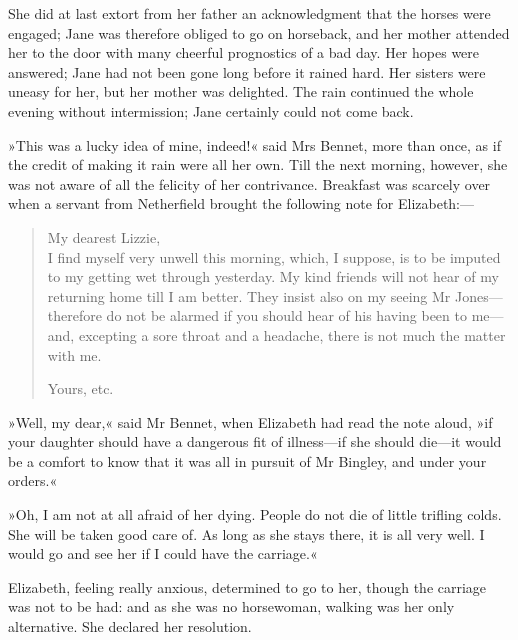 She did at last extort from her father an acknowledgment that the horses were engaged; Jane was therefore obliged to go on horseback, and her mother attended her to the door with many cheerful prognostics of a bad day. Her hopes were answered; Jane had not been gone long before it rained hard. Her sisters were uneasy for her, but her mother was delighted. The rain continued the whole evening without intermission; Jane certainly could not come back.

»This was a lucky idea of mine, indeed!« said Mrs Bennet, more than once, as if the credit of making it rain were all her own. Till the next morning, however, she was not aware of all the felicity of her contrivance. Breakfast was scarcely over when a servant from Netherfield brought the following note for Elizabeth:—


\begin{samepage}
\begin{quotation}
\noindent My dearest Lizzie,\\

\indent I find myself very unwell this morning, which, I suppose, is to be imputed to my getting wet through yesterday. My kind friends will not hear of my returning home till I am better. They insist also on my seeing Mr Jones—therefore do not be alarmed if you should hear of his having been to me—and, excepting a sore throat and a headache, there is not much the matter with me.\\
\vspace{-8pt}

\begin{flushright}
\noindent Yours, etc.
\end{flushright}
\end{quotation}
\end{samepage}



»Well, my dear,« said Mr Bennet, when Elizabeth had read the note aloud, »if your daughter should have a dangerous fit of illness—if she should die—it would be a comfort to know that it was all in pursuit of Mr Bingley, and under your orders.«

»Oh, I am not at all afraid of her dying. People do not die of little trifling colds. She will be taken good care of. As long as she stays there, it is all very well. I would go and see her if I could have the carriage.«

Elizabeth, feeling really anxious, determined to go to her, though the carriage was not to be had: and as she was no horsewoman, walking was her only alternative. She declared her resolution.

